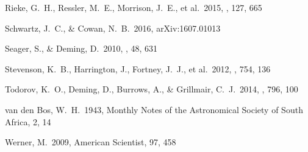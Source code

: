 \documentclass[twocolumn]{aastex61}
\begin{document}
\begin{thebibliography}{38}
 Rieke, G.~H., Ressler, M.~E., Morrison, J.~E., et al.\ 2015, \pasp, 127, 665

 Schwartz, J.~C., \& Cowan, N.~B.\ 2016, arXiv:1607.01013

 Seager, S., \& Deming, D.\ 2010, \araa, 48, 631

 Stevenson, K.~B., Harrington, J., Fortney, J.~J., et al.\ 2012, \apj, 754, 136

 Todorov, K.~O., Deming, D., Burrows, A., \& Grillmair, C.~J.\ 2014, \apj, 796, 100

 van den Bos, W.~H.\ 1943, Monthly Notes of the Astronomical Society of South Africa, 2, 14

 Werner, M.\ 2009, American Scientist, 97, 458

\end{thebibliography}
\end{document}
